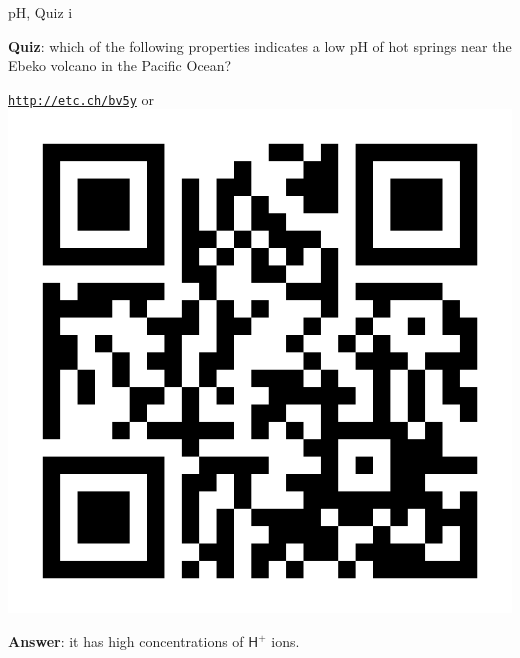 %
%
\begin{frame}{pH, Quiz \: i}

\alert{\bf Quiz}: which of the following properties indicates a low pH of hot springs near the Ebeko volcano in the Pacific Ocean?
%
\vskip 10pt
\begin{center}
	\href{http://etc.ch/bv5y}{\textcolor{indigo(dye)}{\tt http://etc.ch/bv5y}} 
	\quad
	or 
	\quad
	\includegraphics[height=0.2\columnwidth]{figures/chemical-equilibrium/poll.png}
\end{center}
\vskip 10pt
\hiddenpause
{\bf Answer}: it has high concentrations of $\mathsf{H^+}$ ions.
\end{frame}

